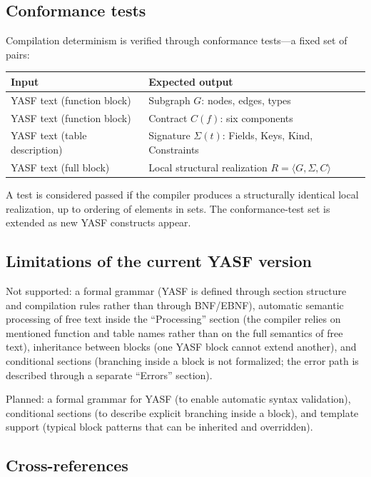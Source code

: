 \subsection{Conformance tests}

Compilation determinism is verified through conformance tests---a fixed set of pairs:

\begin{tabular}{ll}
\hline
\textbf{Input} & \textbf{Expected output} \\
\hline
YASF text (function block) & Subgraph $G$: nodes, edges, types \\
YASF text (function block) & Contract $C(f)$: six components \\
YASF text (table description) & Signature $\Sigma(t)$: Fields, Keys, Kind, Constraints \\
YASF text (full block) & Local structural realization $R = \langle G, \Sigma, C \rangle$ \\
\hline
\end{tabular}

\vspace{0.5em}
A test is considered passed if the compiler produces a structurally identical local realization, up to ordering of elements in sets. The conformance-test set is extended as new YASF constructs appear.

\subsection{Limitations of the current YASF version}

Not supported: a formal grammar (YASF is defined through section structure and compilation rules rather than through BNF/EBNF), automatic semantic processing of free text inside the ``Processing'' section (the compiler relies on mentioned function and table names rather than on the full semantics of free text), inheritance between blocks (one YASF block cannot extend another), and conditional sections (branching inside a block is not formalized; the error path is described through a separate ``Errors'' section).

Planned: a formal grammar for YASF (to enable automatic syntax validation), conditional sections (to describe explicit branching inside a block), and template support (typical block patterns that can be inherited and overridden).

\subsection{Cross-references}

